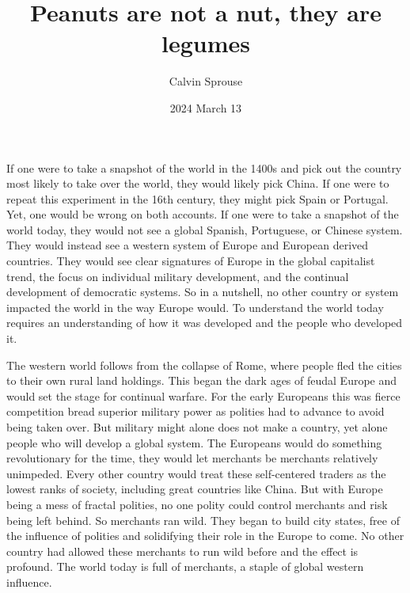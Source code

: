\documentclass[a4paper, 12pt]{article}
\title{Peanuts are not a nut, they are legumes}
\author{Calvin Sprouse}
\affil{Geography 101 World Regional Geography}
\date{2024 March 13}
\begin{document}
\maketitle

If one were to take a snapshot of the world in the 1400s and pick out the country most likely to take over the world, they would likely pick China. If one were to repeat this experiment in the 16th century, they might pick Spain or Portugal. Yet, one would be wrong on both accounts. If one were to take a snapshot of the world today, they would not see a global Spanish, Portuguese, or Chinese system. They would instead see a western system of Europe and European derived countries. They would see clear signatures of Europe in the global capitalist trend, the focus on individual military development, and the continual development of democratic systems. So in a nutshell, no other country or system impacted the world in the way Europe would. To understand the world today requires an understanding of how it was developed and the people who developed it.

The western world follows from the collapse of Rome, where people fled the cities to their own rural land holdings. This began the dark ages of feudal Europe and would set the stage for continual warfare. For the early Europeans this was fierce competition bread superior military power as polities had to advance to avoid being taken over. But military might alone does not make a country, yet alone people who will develop a global system. The Europeans would do something revolutionary for the time, they would let merchants be merchants relatively unimpeded. Every other country would treat these self-centered traders as the lowest ranks of society, including great countries like China. But with Europe being a mess of fractal polities, no one polity could control merchants and risk being left behind. So merchants ran wild. They began to build city states, free of the influence of polities and solidifying their role in the Europe to come. No other country had allowed these merchants to run wild before and the effect is profound. The world today is full of merchants, a staple of global western influence.
\end{document}
